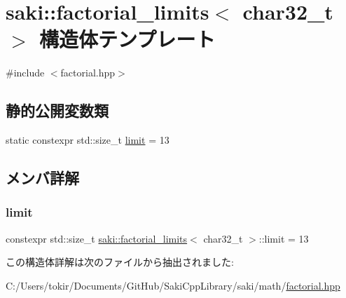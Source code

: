 \hypertarget{structsaki_1_1factorial__limits_3_01char32__t_01_4}{}\section{saki\+:\+:factorial\+\_\+limits$<$ char32\+\_\+t $>$ 構造体テンプレート}
\label{structsaki_1_1factorial__limits_3_01char32__t_01_4}


{\ttfamily \#include $<$factorial.\+hpp$>$}

\subsection*{静的公開変数類}
\begin{DoxyCompactItemize}
\item 
static constexpr std\+::size\+\_\+t \mbox{\hyperlink{structsaki_1_1factorial__limits_3_01char32__t_01_4_a70ec9b7157ebb1ed3ac25580762ee018}{limit}} = 13
\end{DoxyCompactItemize}


\subsection{メンバ詳解}
\mbox{\label{structsaki_1_1factorial__limits_3_01char32__t_01_4_a70ec9b7157ebb1ed3ac25580762ee018}} 
\subsubsection{\texorpdfstring{limit}{limit}}
{\footnotesize\ttfamily constexpr std\+::size\+\_\+t \mbox{\hyperlink{structsaki_1_1factorial__limits}{saki\+::factorial\+\_\+limits}}$<$ char32\+\_\+t $>$\+::limit = 13\hspace{0.3cm}{\ttfamily [static]}}



この構造体詳解は次のファイルから抽出されました\+:\begin{DoxyCompactItemize}
\item 
C\+:/\+Users/tokir/\+Documents/\+Git\+Hub/\+Saki\+Cpp\+Library/saki/math/\mbox{\hyperlink{factorial_8hpp}{factorial.\+hpp}}\end{DoxyCompactItemize}
